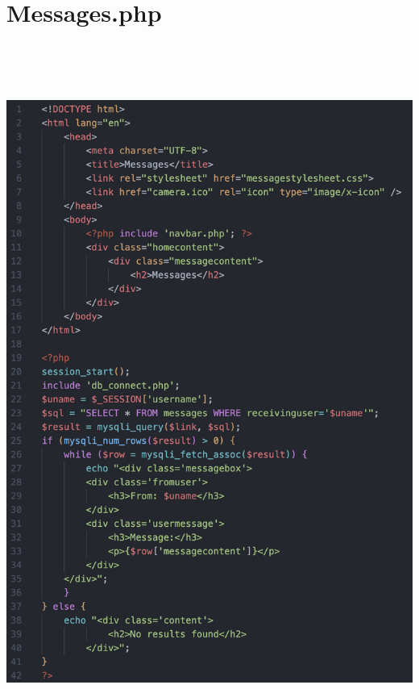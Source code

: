 \section*{Messages.php}\includegraphics[width=6.26806in,height=8.97639in]{ch6_appendix/media/image21.png}

